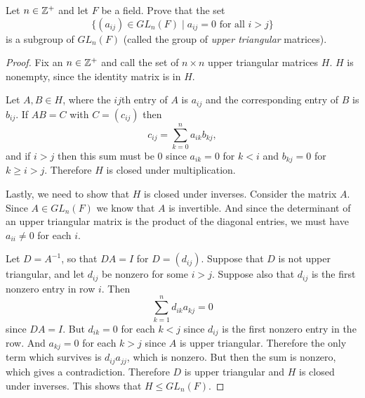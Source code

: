  Let $n\in\mathbb{Z}^+$ and let $F$ be a field. Prove that the
set
\begin{equation*}
  \{(a_{ij})\in GL_n(F)\mid \text{$a_{ij} = 0$ for all $i > j$}\}
\end{equation*}
is a subgroup of $GL_n(F)$ (called the group of {\em upper triangular}
matrices).
\begin{proof}
  Fix an $n\in\mathbb{Z}^+$ and call the set of $n\times n$ upper triangular
  matrices $H$. $H$ is nonempty, since the identity matrix is in $H$.

  Let $A, B\in H$, where the $ij$th entry of $A$ is $a_{ij}$ and the
  corresponding entry of $B$ is $b_{ij}$. If $AB = C$ with
  $C = (c_{ij})$ then
  \begin{equation*}
    c_{ij} = \sum_{k=0}^n a_{ik}b_{kj},
  \end{equation*}
  and if $i > j$ then this sum must be $0$ since $a_{ik} = 0$ for
  $k < i$ and $b_{kj} = 0$ for $k \geq i > j$. Therefore $H$ is closed
  under multiplication.

  Lastly, we need to show that $H$ is closed under inverses. Consider
  the matrix $A$. Since $A\in GL_n(F)$ we know that $A$ is
  invertible. And since the determinant of an upper triangular matrix
  is the product of the diagonal entries, we must have $a_{ii}\neq 0$
  for each $i$.

  Let $D = A^{-1}$, so that $DA = I$ for $D = (d_{ij})$. Suppose that
  $D$ is not upper triangular, and let $d_{ij}$ be nonzero for some
  $i > j$. Suppose also that $d_{ij}$ is the first nonzero entry in
  row $i$. Then
  \begin{equation*}
    \sum_{k=1}^n d_{ik}a_{kj} = 0
  \end{equation*}
  since $DA = I$. But $d_{ik} = 0$ for each $k < j$ since $d_{ij}$ is
  the first nonzero entry in the row. And $a_{kj} = 0$ for each
  $k > j$ since $A$ is upper triangular. Therefore the only term which
  survives is $d_{ij}a_{jj}$, which is nonzero. But then the sum is
  nonzero, which gives a contradiction. Therefore $D$ is upper
  triangular and $H$ is closed under inverses. This shows that
  $H\leq GL_n(F)$.
\end{proof}
